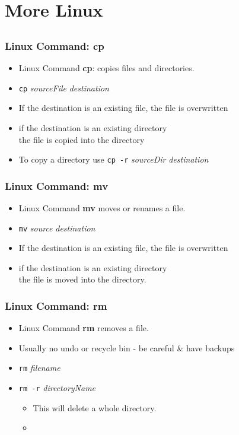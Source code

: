 \section{More Linux}
\subsection{}

\begin{frame}[fragile=singleslide]
\frametitle{Linux Command: cp}


\begin{itemize}
\item  Linux Command {\bf cp}: copies files and directories.
\item \texttt{cp} \textit{sourceFile} \textit{destination}
\item
If the destination is an existing file, the file is overwritten 
\item
if
the destination is an existing directory \\ 
the file is copied into the directory
\item To copy a directory use \texttt{cp -r} \textit{sourceDir} \textit{destination}
\end{itemize}
\end{frame}


\begin{frame}
\frametitle{Linux Command: mv}

\begin{itemize}
\item Linux Command {\bf mv} moves or renames a file.
\item \texttt{mv} \textit{source} \textit{destination}
\item
If the destination is an existing file, the file is overwritten
\item
if the destination is an existing directory \\
the file is moved into the directory.
\end{itemize}
\end{frame}

\begin{frame}[fragile=singleslide]
\frametitle{Linux Command: rm}

\begin{itemize}
\item Linux Command {\bf rm} removes a file.
\item Usually no undo or recycle bin - be careful \& have backups
\item \texttt{rm} \textit{filename}
\item \texttt{rm -r} \textit{directoryName}
\begin{itemize}
\item This will delete a whole directory.
\item {}
\end{itemize}
\end{itemize}
\end{frame}


